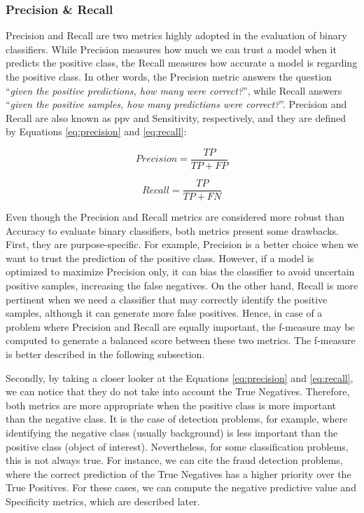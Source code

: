 \subsubsection{Precision \& Recall} \label{precision-recall}

Precision and Recall are two metrics highly adopted in the evaluation of binary classifiers. While Precision measures how much we can trust a model when it predicts the positive class, the Recall measures how accurate a model is regarding the positive class. In other words, the Precision metric answers the question ``\textit{given the positive predictions, how many were correct?}'', while Recall answers ``\textit{given the positive samples, how many predictions were correct?}''. Precision and Recall are also known as \acf{ppv} and Sensitivity, respectively, and they are defined by Equations \ref{eq:precision} and \ref{eq:recall}: 

\begin{equation}
\label{eq:precision}
Precision = \frac{TP}{TP + FP}
\end{equation}

\begin{equation}
\label{eq:recall}
Recall = \frac{TP}{TP + FN}
\end{equation}

Even though the Precision and Recall metrics are considered more robust than Accuracy to evaluate binary classifiers, both metrics present some drawbacks. First, they are purpose-specific. For example, Precision is a better choice when we want to trust the prediction of the positive class. However, if a model is optimized to maximize Precision only, it can bias the classifier to avoid uncertain positive samples, increasing the false negatives. On the other hand, Recall is more pertinent when we need a classifier that may correctly identify the positive samples, although it can generate more false positives. Hence, in case of a problem where Precision and Recall are equally important, the f-measure may be computed to generate a balanced score between these two metrics. The f-measure is better described in the following subsection.

Secondly, by taking a closer looker at the Equations \ref{eq:precision} and \ref{eq:recall}, we can notice that they do not take into account the True Negatives. Therefore, both metrics are more appropriate when the positive class is more important than the negative class. It is the case of detection problems, for example, where identifying the negative class (usually background) is less important than the positive class (object of interest). Nevertheless, for some classification problems, this is not always true. For instance, we can cite the fraud detection problems, where the correct prediction of the True Negatives has a higher priority over the True Positives. For these cases, we can compute the negative predictive value and Specificity metrics, which are described later.

